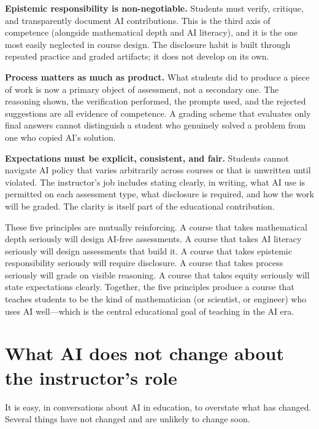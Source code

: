 \documentclass[11pt]{book}
\begin{document}
\textbf{Epistemic responsibility is non-negotiable.} Students must verify, critique, and transparently document AI contributions. This is the third axis of competence (alongside mathematical depth and AI literacy), and it is the one most easily neglected in course design. The disclosure habit is built through repeated practice and graded artifacts; it does not develop on its own.

\textbf{Process matters as much as product.} What students did to produce a piece of work is now a primary object of assessment, not a secondary one. The reasoning shown, the verification performed, the prompts used, and the rejected suggestions are all evidence of competence. A grading scheme that evaluates only final answers cannot distinguish a student who genuinely solved a problem from one who copied AI's solution.

\textbf{Expectations must be explicit, consistent, and fair.} Students cannot navigate AI policy that varies arbitrarily across courses or that is unwritten until violated. The instructor's job includes stating clearly, in writing, what AI use is permitted on each assessment type, what disclosure is required, and how the work will be graded. The clarity is itself part of the educational contribution.

These five principles are mutually reinforcing. A course that takes mathematical depth seriously will design AI-free assessments. A course that takes AI literacy seriously will design assessments that build it. A course that takes epistemic responsibility seriously will require disclosure. A course that takes process seriously will grade on visible reasoning. A course that takes equity seriously will state expectations clearly. Together, the five principles produce a course that teaches students to be the kind of mathematician (or scientist, or engineer) who uses AI well---which is the central educational goal of teaching in the AI era.

\section{What AI does not change about the instructor's role}

It is easy, in conversations about AI in education, to overstate what has changed. Several things have not changed and are unlikely to change soon.
\end{document}
